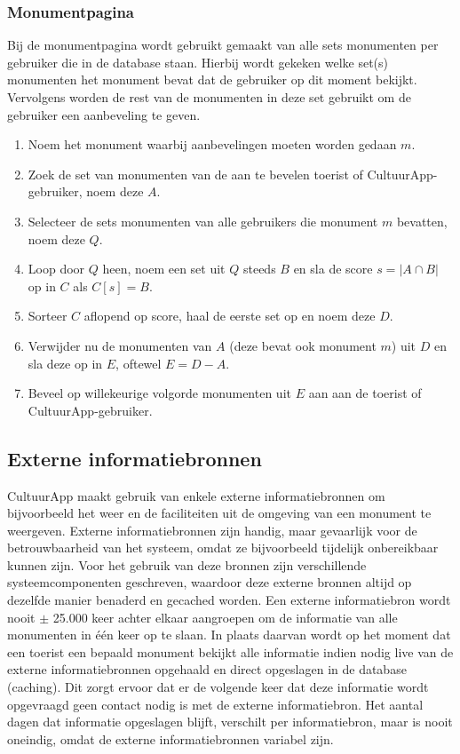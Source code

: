 \documentclass[a4paper,10pt]{article}
\begin{document}
		\subsubsection{Monumentpagina}
		Bij de monumentpagina wordt gebruikt gemaakt van alle sets monumenten per gebruiker die in de database staan. Hierbij wordt gekeken welke set(s) monumenten het monument bevat dat de gebruiker op dit moment bekijkt. Vervolgens worden de rest van de monumenten in deze set gebruikt om de gebruiker een aanbeveling te geven.
		\begin{enumerate}
			\item Noem het monument waarbij aanbevelingen moeten worden gedaan $m$.
			\item Zoek de set van monumenten van de aan te bevelen toerist of CultuurApp-gebruiker, noem deze $A$.
			\item Selecteer de sets monumenten van alle gebruikers die monument $m$ bevatten, noem deze $Q$.
			\item Loop door $Q$ heen, noem een set uit $Q$ steeds $B$ en sla de score $s = \left|A \cap B\right|$ op in $C$ als $C\left[s\right] = B$.
			\item Sorteer $C$ aflopend op score, haal de eerste set op en noem deze $D$.
			\item Verwijder nu de monumenten van $A$ (deze bevat ook monument $m$) uit $D$ en sla deze op in $E$, oftewel $E = D - A$.
			\item Beveel op willekeurige volgorde monumenten uit $E$ aan aan de toerist of CultuurApp-gebruiker.
		\end{enumerate}
	
	\subsection{Externe informatiebronnen}
		CultuurApp maakt gebruik van enkele externe informatiebronnen om bijvoorbeeld het weer en de faciliteiten uit de omgeving van een monument te  weergeven. Externe informatiebronnen zijn handig, maar gevaarlijk voor de betrouwbaarheid van het systeem, omdat ze bijvoorbeeld tijdelijk onbereikbaar kunnen zijn. Voor het gebruik van deze bronnen zijn verschillende systeemcomponenten geschreven, waardoor deze externe bronnen altijd op dezelfde manier benaderd en gecached worden. Een externe informatiebron wordt nooit $\pm$ 25.000 keer achter elkaar aangroepen om de informatie van alle monumenten in \'e\'en keer op te slaan. In plaats daarvan wordt op het moment dat een toerist een bepaald monument bekijkt alle informatie indien nodig live van de externe informatiebronnen opgehaald en direct opgeslagen in de database (caching). Dit zorgt ervoor dat er de volgende keer dat deze informatie wordt opgevraagd geen contact nodig is met de externe informatiebron. Het aantal dagen dat informatie opgeslagen blijft, verschilt per informatiebron, maar is nooit oneindig, omdat de externe informatiebronnen variabel zijn.
	
\end{document}
